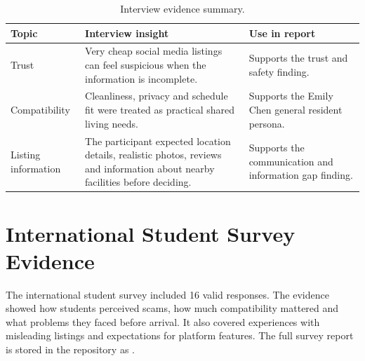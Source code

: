 \documentclass[11pt,a4paper]{article}
\begin{document}
\begin{table}[H]
    \centering
    \small
    \caption{Interview evidence summary.}
    \begin{tabularx}{\textwidth}{@{}L{3.8cm} Y Y@{}}
        \toprule
        Topic & Interview insight & Use in report\\
        \midrule
        Trust & Very cheap social media listings can feel suspicious when the information is incomplete. & Supports the trust and safety finding.\\
        Compatibility & Cleanliness, privacy and schedule fit were treated as practical shared living needs. & Supports the Emily Chen general resident persona.\\
        Listing information & The participant expected location details, realistic photos, reviews and information about nearby facilities before deciding. & Supports the communication and information gap finding.\\
        \bottomrule
    \end{tabularx}
\end{table}

\section{International Student Survey Evidence}

The international student survey included 16 valid responses. The evidence showed how students perceived scams, how much compatibility mattered and what problems they faced before arrival. It also covered experiences with misleading listings and expectations for platform features. The full survey report is stored in the repository as .
\end{document}
